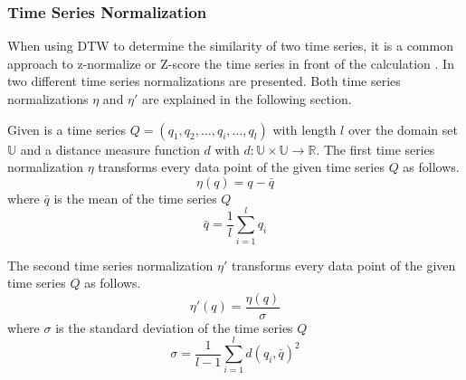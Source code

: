 \subsubsection{Time Series Normalization} \label{time_series_normalization}
When using DTW to determine the similarity of two time series, it is a common approach to z-normalize or Z-score the
time series in front of the calculation \cite{ding2008querying}. In \cite{das1998rule} two different time series
normalizations are presented. Both time series normalizations $\eta$ and $\eta '$ are explained in the following
section.

Given is a time series $Q = (q_1, q_2, \dots, q_i, \dots, q_l)$ with length $l$ over the domain set $\mathbb{U}$ and a
distance measure function $d$ with $d: \mathbb{U} \times \mathbb{U} \to \mathbb{R}$. The first time series normalization
$\eta$ transforms every data
point of the given time series $Q$ as follows.
\begin{equation}
    \eta (q) = q -\bar{q}
\end{equation}
where $\bar{q}$ is the mean of the time series $Q$
\begin{equation}
    \bar{q} = \frac{1}{l} \sum \limits_{i=1}^{l} q_i
\end{equation}

The second time series normalization $\eta '$ transforms every data point of the given time series $Q$ as follows.
\begin{equation}
    \eta '(q) = \frac{\eta (q)}{\sigma}
\end{equation}
where $\sigma$ is the standard deviation of the time series $Q$
\begin{equation}
    \sigma = \frac{1}{l-1} \sum \limits_{i=1}^{l} d(q_i, \bar{q})^2
\end{equation}
